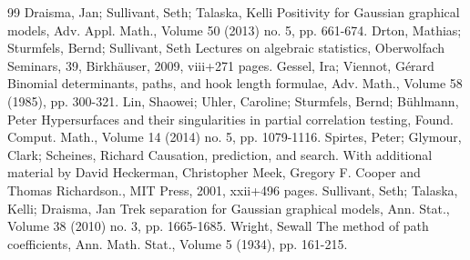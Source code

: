 \begin{thebibliography}{99}
 Draisma, Jan; Sullivant, Seth; Talaska, Kelli Positivity for Gaussian graphical models, Adv. Appl. Math., Volume 50 (2013) no. 5, pp. 661-674.
 Drton, Mathias; Sturmfels, Bernd; Sullivant, Seth Lectures on algebraic statistics, Oberwolfach Seminars, 39, Birkhäuser, 2009, viii+271 pages.
 Gessel, Ira; Viennot, Gérard Binomial determinants, paths, and hook length formulae, Adv. Math., Volume 58 (1985), pp. 300-321.
 Lin, Shaowei; Uhler, Caroline; Sturmfels, Bernd; Bühlmann, Peter Hypersurfaces and their singularities in partial correlation testing, Found. Comput. Math., Volume 14 (2014) no. 5, pp. 1079-1116.
 Spirtes, Peter; Glymour, Clark; Scheines, Richard Causation, prediction, and search. With additional material by David Heckerman, Christopher Meek, Gregory F. Cooper and Thomas Richardson., MIT Press, 2001, xxii+496 pages.
 Sullivant, Seth; Talaska, Kelli; Draisma, Jan Trek separation for Gaussian graphical models, Ann. Stat., Volume 38 (2010) no. 3, pp. 1665-1685.
 Wright, Sewall The method of path coefficients, Ann. Math. Stat., Volume 5 (1934), pp. 161-215.
\end{thebibliography}

